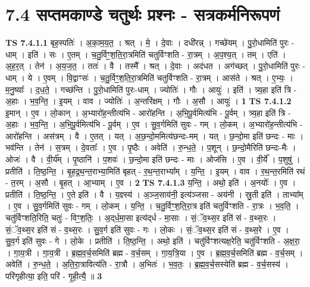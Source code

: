 \documentclass[17pt]{extarticle}
\begin{document}
\section*{ 7.4      सप्तमकाण्डे चतुर्थः प्रश्नः - सत्रकर्मनिरूपणं }
                                \textbf{ TS 7.4.1.1} \newline
                  बृह॒स्पतिः॑ । अ॒का॒म॒य॒त॒ । श्रत् । मे॒ । दे॒वाः । दधी॑रन्न् । गच्छे॑यम् । पु॒रो॒धामिति॑ पुरः - धाम् । इति॑ । सः । ए॒तम् । च॒तु॒र्विꣳ॒॒श॒ति॒रा॒त्रमिति॑ चतुर्विꣳशति - रा॒त्रम् । अ॒प॒श्य॒त् । तम् । एति॑ । अ॒ह॒र॒त् । तेन॑ । अ॒य॒ज॒त॒ । ततः॑ । वै । तस्मै᳚ । श्रत् । दे॒वाः । अद॑धत । अग॑च्छत् । पु॒रो॒धामिति॑ पुरः - धाम् । ये । ए॒वम् । वि॒द्वाꣳसः॑ । च॒तु॒र्विꣳ॒॒श॒ति॒रा॒त्रमिति॑ चतुर्विꣳशति - रा॒त्रम् । आस॑ते । श्रत् । ए॒भ्यः॒ । म॒नु॒ष्याः᳚ । द॒ध॒ते॒ । गच्छ॑न्ति । पु॒रो॒धामिति॑ पुरः-धाम् । ज्योतिः॑ । गौः । आयुः॑ । इति॑ । त्र्य॒हा इति॑ त्रि - अ॒हाः । भ॒व॒न्ति॒ । इ॒यम् । वाव । ज्योतिः॑ । अ॒न्तरि॑क्षम् । गौः । अ॒सौ । आयुः॑ । \textbf{  1} \newline
                  \newline
                                \textbf{ TS 7.4.1.2} \newline
                  इ॒मान् । ए॒व । लो॒कान् । अ॒भ्यारो॑ह॒न्तीत्य॑भि - आरो॑हन्ति । अ॒भि॒पू॒र्वमित्य॑भि - पू॒र्वम् । त्र्य॒हा इति॑ त्रि - अ॒हाः । भ॒व॒न्ति॒ । अ॒भि॒पू॒र्वमित्य॑भि - पू॒र्वम् । ए॒व । सु॒व॒र्गमिति॑ सुवः - गम् । लो॒कम् । अ॒भ्यारो॑ह॒न्तीत्य॑भि - आरो॑हन्ति । अस॑त्रम् । वै । ए॒तत् । यत् । अ॒छ॒न्दो॒ममित्य॑छन्दः-मम् । यत् । छ॒न्दो॒मा इति॑ छन्दः - माः । भव॑न्ति । तेन॑ । स॒त्रम् । दे॒वताः᳚ । ए॒व । पृ॒ष्ठैः । अवेति॑ । रु॒न्ध॒ते॒ । प॒शून् । छ॒न्दो॒मैरिति॑ छन्दः-मैः । ओजः॑ । वै । वी॒र्य᳚म् । पृ॒ष्ठानि॑ । प॒शवः॑ । छ॒न्दो॒मा इति॑ छन्दः - माः । ओज॑सि । ए॒व । वी॒र्ये᳚ । प॒शुषु॑ । प्रतीति॑ । ति॒ष्ठ॒न्ति॒ । बृ॒ह॒द्र॒थ॒न्त॒राभ्या॒मिति॑ बृहत् - र॒थ॒न्त॒राभ्या᳚म् । य॒न्ति॒ । इ॒यम् । वाव । र॒थ॒न्त॒रमिति॑ रथं - त॒रम् । अ॒सौ । बृ॒हत् । आ॒भ्याम् । ए॒व । \textbf{  2} \newline
                  \newline
                                \textbf{ TS 7.4.1.3} \newline
                  य॒न्ति॒ । अथो॒ इति॑ । अ॒नयोः᳚ । ए॒व । प्रतीति॑ । ति॒ष्ठ॒न्ति॒ । ए॒ते इति॑ । वै । य॒ज्ञ्स्य॑ । अ॒ञ्ज॒साय॑नी॒ इत्य॑ञ्जसा - अय॑नी । स्रु॒ती इति॑ । ताभ्या᳚म् । ए॒व । सु॒व॒र्गमिति॑ सुवः - गम् । लो॒कम् । य॒न्ति॒ । च॒तु॒र्विꣳ॒॒श॒ति॒रा॒त्र इति॑ चतुर्विꣳशति - रा॒त्रः । भ॒व॒ति॒ । चतु॑र्विꣳशति॒रिति॒ चतुः॑ - विꣳ॒॒श॒तिः॒ । अ॒द्‌र्ध॒मा॒सा इत्य॑द्‌र्ध - मा॒साः । सं॒ॅव॒थ्स॒र इति॑ सं - व॒थ्स॒रः । सं॒ॅव॒थ्स॒र इति॑ सं - व॒थ्स॒रः । सु॒व॒र्ग इति॑ सुवः - गः । लो॒कः । सं॒ॅव॒थ्स॒र इति॑ सं - व॒थ्स॒रे । ए॒व । सु॒व॒र्ग इति॑ सुवः - गे । लो॒के । प्रतीति॑ । ति॒ष्ठ॒न्ति॒ । अथो॒ इति॑ । चतु॑र्विꣳशत्यक्ष॒रेति॒ चतु॑र्विꣳशति - अ॒क्ष॒रा॒ । गा॒य॒त्री । गा॒य॒त्री । ब्र॒ह्म॒व॒र्च॒समिति॑ ब्रह्म - व॒र्च॒सम् । गा॒य॒त्रि॒या । ए॒व । ब्र॒ह्म॒व॒र्च॒समिति॑ ब्रह्म - व॒र्च॒सम् । अवेति॑ । रु॒न्ध॒ते॒ । अ॒ति॒रा॒त्रावित्य॑ति - रा॒त्रौ । अ॒भितः॑ । भ॒व॒तः॒ । ब्र॒ह्म॒व॒र्च॒सस्येति॑ ब्रह्म - व॒र्च॒सस्य॑ । परि॑गृहीत्या॒ इति॒ परि॑ - गृ॒ही॒त्यै॒ ॥ \textbf{  3} \newline
\end{document}
